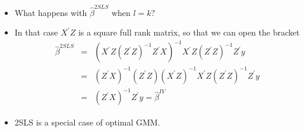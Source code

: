\documentclass[notes=show]{beamer}
\begin{document}
\begin{frame}%


\begin{itemize}
\item What happens with $\widehat{\beta }^{2SLS}$ when $l=k?$

\item In that case $X^{\prime }Z$ is a square full rank matrix, so that we
can open the bracket%
\begin{eqnarray*}
\widehat{\beta }^{2SLS} &=&(X^{\prime }Z(Z^{\prime }Z)^{-1}Z^{\prime
}X)^{-1}X^{\prime }Z(Z^{\prime }Z)^{-1}Z^{\prime }y \\
&=&(Z^{\prime }X)^{-1}(Z^{\prime }Z)(X^{\prime }Z)^{-1}X^{\prime
}Z(Z^{\prime }Z)^{-1}Z^{\prime }y \\
&=&(Z^{\prime }X)^{-1}Z^{\prime }y=\widehat{\beta }^{IV}
\end{eqnarray*}

\item 2SLS is a special case of optimal GMM.
\end{itemize}

\end{frame}%
\end{document}
